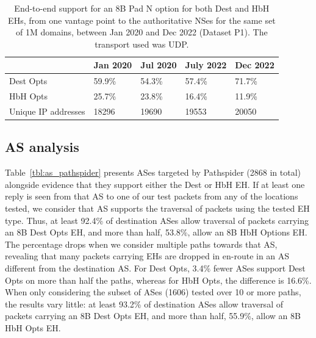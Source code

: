 \documentclass[conference]{IEEEtran}
\begin{document}
\begin{table}[]
\begin{tabular}{l|l|l|l|l}
                    & Jan 2020 & Jul 2020 & July 2022 & Dec 2022 \\
\hline
Dest Opts & 59.9\%   & 54.3\%   & 57.4\%    & 71.7\%   \\
HbH Opts  & 25.7\%   & 23.8\%   & 16.4\%    & 11.9\%   \\
\hline
Unique IP addresses & 18296    & 19690    & 19553     & 20050   
\end{tabular}
\label{tbl:longitudinal_support}
\caption{End-to-end support for an 8B Pad N option for both Dest and HbH EHs, from one vantage point to the authoritative NSes for the same set of 1M domains, between Jan 2020 and Dec 2022 (Dataset P1). The transport used was UDP.}
\end{table}

\subsection{AS analysis }

Table~\ref{tbl:as_pathspider} presents ASes targeted by Pathspider (2868 in total) alongside evidence that they support either the Dest or HbH EH.
If at least one reply is seen from that AS to one of our test packets from any of the locations tested, we consider that AS supports the traversal of packets using the tested EH type. Thus, at least 92.4\% of destination ASes allow traversal of packets carrying an 8B Dest Opts EH, and more than half, 53.8\%, allow an 8B HbH Options EH. The percentage drops when we consider multiple paths towards that AS, revealing that many packets carrying EHs are dropped in en-route in an AS different from the destination AS. For Dest Opts, 3.4\% fewer ASes support Dest Opts on more than half the paths, whereas for HbH Opts, the difference is 16.6\%.
When only considering the subset of ASes (1606) tested over 10 or more paths, the results vary little: at least 93.2\% of destination ASes allow traversal of packets carrying an 8B Dest Opts EH, and more than half, 55.9\%, allow an 8B HbH Opts EH.
\end{document}
